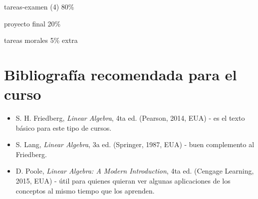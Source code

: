 tareas-examen (4) 80\%

proyecto final  20\%

tareas morales     5\% extra

%
%

\section*{Bibliografía recomendada para el curso} \label{Bibliografía}

\begin{itemize}
    \item S. H. Friedberg, \emph{Linear Algebra}, 4ta ed. (Pearson, 2014, EUA) - es el texto básico para este tipo de cursos.
    \item S. Lang, \emph{Linear Algebra}, 3a ed. (Springer, 1987, EUA) - buen complemento al Friedberg.
    \item D. Poole, \emph{Linear Algebra: A Modern Introduction}, 4ta ed. (Cengage Learning, 2015, EUA) - útil para quienes quieran ver algunas aplicaciones de los conceptos al mismo tiempo que los aprenden.
\end{itemize}{}

